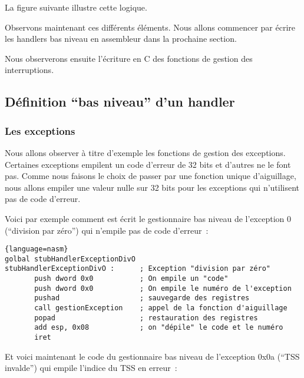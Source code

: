 \begin{itemize}
   La figure suivante illustre cette logique.


   Observons maintenant ces différents éléments. Nous allons commencer
par écrire les handlers bas niveau en assembleur dans la prochaine
section.

   Nous observerons ensuite l'écriture en C  des fonctions de gestion
des interruptions.

%      
\subsection{Définition ``bas niveau'' d'un handler}

%
\subsubsection{Les exceptions}

   Nous allons observer à titre d'exemple les fonctions de gestion des
exceptions. Certaines exceptions empilent un code d'erreur de 32 bits
et d'autres ne le font pas. Comme nous faisons le choix de passer par
une fonction unique d'aiguillage, nous allons empiler une valeur nulle
sur 32 bits pour les exceptions qui n'utilisent pas de code d'erreur.

   Voici par exemple comment est écrit le gestionnaire bas niveau de
l'exception 0 (``division par zéro'') qui n'empile pas de code
d'erreur~:

\begin{lstlisting}{language=nasm}
golbal stubHandlerExceptionDivO
stubHandlerExceptionDivO :      ; Exception "division par zéro"
       push dword 0x0           ; On empile un "code"
       push dword 0x0           ; On empile le numéro de l'exception
       pushad                   ; sauvegarde des registres
       call gestionException    ; appel de la fonction d'aiguillage
       popad                    ; restauration des registres
       add esp, 0x08            ; on "dépile" le code et le numéro
       iret
\end{lstlisting}

   Et voici maintenant le code du gestionnaire bas niveau de
l'exception 0x0a (``TSS invalde'') qui empile l'indice du TSS en
erreur~:


\end{itemize}
